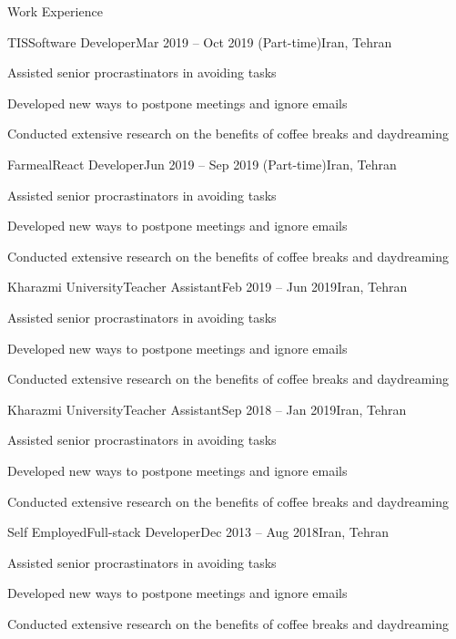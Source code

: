 \documentclass[]{main}
\begin{document}
\begin{section}{Work Experience}
 \begin{subsection}{TIS}{Software Developer}{Mar 2019 -- Oct 2019 (Part-time)}{Iran, Tehran}
     \item Assisted senior procrastinators in avoiding tasks
     \item Developed new ways to postpone meetings and ignore emails
     \item Conducted extensive research on the benefits of coffee breaks and daydreaming
 \end{subsection}

 \begin{subsection}{Farmeal}{React Developer}{Jun 2019 -- Sep 2019 (Part-time)}{Iran, Tehran}
     \item Assisted senior procrastinators in avoiding tasks
     \item Developed new ways to postpone meetings and ignore emails
     \item Conducted extensive research on the benefits of coffee breaks and daydreaming
 \end{subsection}

 \begin{subsection}{Kharazmi University}{Teacher Assistant}{Feb 2019 -- Jun 2019}{Iran, Tehran}
     \item Assisted senior procrastinators in avoiding tasks
     \item Developed new ways to postpone meetings and ignore emails
     \item Conducted extensive research on the benefits of coffee breaks and daydreaming
 \end{subsection}

 \begin{subsection}{Kharazmi University}{Teacher Assistant}{Sep 2018 -- Jan 2019}{Iran, Tehran}
     \item Assisted senior procrastinators in avoiding tasks
     \item Developed new ways to postpone meetings and ignore emails
     \item Conducted extensive research on the benefits of coffee breaks and daydreaming
 \end{subsection}

 \begin{subsection}{Self Employed}{Full-stack Developer}{Dec 2013 -- Aug 2018}{Iran, Tehran}
     \item Assisted senior procrastinators in avoiding tasks
     \item Developed new ways to postpone meetings and ignore emails
     \item Conducted extensive research on the benefits of coffee breaks and daydreaming
 \end{subsection}
\end{section}
\end{document}
